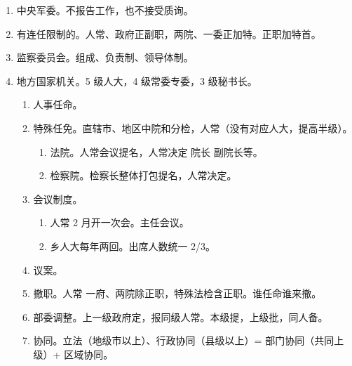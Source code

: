 \begin{enumerate}
\begin{enumerate}
        \end{enumerate}
  \item 中央军委。不报告工作，也不接受质询。
  \item 有连任限制的。人常、政府正副职，两院、一委正加特。正职加特首。
  \item 监察委员会。组成、负责制、领导体制。
  \item 地方国家机关。5 级人大，4 级常委专委，3 级秘书长。
        \begin{enumerate}
          \item 人事任命。
          \item 特殊任免。直辖市、地区中院和分检，人常（没有对应人大，提高半级）。
                \begin{enumerate}
                  \item 法院。人常会议提名，人常决定 \yjt 院长 \yjt 副院长等。
                  \item 检察院。检察长整体打包提名，人常决定。
                \end{enumerate}
          \item 会议制度。
                \begin{enumerate}
                  \item 人常 2 月开一次会。主任会议。
                  \item 乡人大每年两回。出席人数统一 2/3。
                \end{enumerate}
          \item 议案。
          \item 撤职。人常 \yjt 一府、两院除正职，特殊法检含正职。谁任命谁来撤。
          \item 部委调整。上一级政府定，报同级人常。本级提，上级批，同人备。
          \item 协同。立法（地级市以上）、行政协同（县级以上）= 部门协同（共同上级）+ 区域协同。
        \end{enumerate}
\end{enumerate}